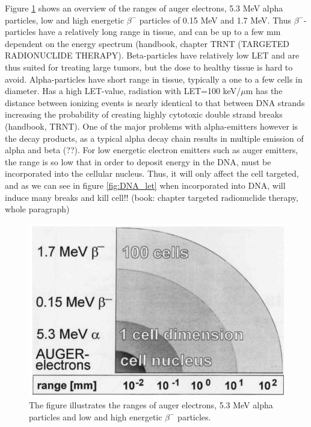 \documentclass[a4paper,11pt,twoside]{book}
\begin{document}
Figure \ref{fig:cell_dimension} shows an overview of the ranges of auger electrons, 5.3 MeV alpha particles, low and high energetic $\beta^-$ particles of 0.15 MeV and 1.7 MeV. Thus $\beta^-$-particles have a relatively long range in tissue, and can be up to a few mm dependent on the energy spectrum (handbook, chapter TRNT (TARGETED RADIONUCLIDE THERAPY). Beta-particles have relatively low LET and are thus suited for treating large tumors, but the dose to healthy tissue is hard to avoid.  Alpha-particles have short range in tissue, typically a one to a few cells in diameter. Has a high LET-value, radiation with LET=100 keV/$\mu$m has the distance between ionizing events is nearly identical to that between DNA strands increasing the probability of creating highly cytotoxic double strand breaks (handbook, TRNT). One of the major problems with alpha-emitters however is the decay products, as a typical alpha decay chain results in multiple emission of alpha and beta (??). For low energetic electron emitters such as auger emitters, the range is so low that in order to deposit energy in the DNA, must be incorporated into the cellular nucleus. Thus, it will only affect the cell targeted, and as we can see in figure \ref{fig:DNA_let} when incorporated into DNA, will induce many breaks and kill cell!!  (book: chapter targeted radionuclide therapy, whole paragraph) \\

\begin{figure}
    \centering
    \includegraphics{Theory/cell_dimension.png}
    \caption{The figure illustrates the ranges of auger electrons, 5.3 MeV alpha particles and low and high energetic $\beta^-$ particles. }
    \label{fig:cell_dimension}
\end{figure}
\end{document}
